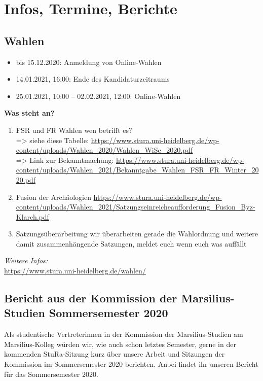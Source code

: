 \section{Infos, Termine, Berichte}

\subsection{Wahlen}
\begin{itemize}
    \item bis 15.12.2020: Anmeldung von Online-Wahlen
    \item 14.01.2021, 16:00: Ende des Kandidaturzeitraums
    \item 25.01.2021, 10:00 – 02.02.2021, 12:00: Online-Wahlen
\end{itemize}
\textbf{Was steht an?}
\begin{enumerate}
    \item FSR und FR Wahlen wen betrifft es?\\
    => siehe diese Tabelle: \url{https://www.stura.uni-heidelberg.de/wp-content/uploads/Wahlen_2020/Wahlen_WiSe_2020.pdf}\\
    => Link zur Bekanntmachung: \url{https://www.stura.uni-heidelberg.de/wp-content/uploads/Wahlen_2021/Bekanntgabe_Wahlen_FSR_FR_Winter_2020.pdf}
    \item Fusion der Archäologien \url{https://www.stura.uni-heidelberg.de/wp-content/uploads/Wahlen_2021/Satzungseinreicheaufforderung_Fusion_Byz-Klarch.pdf}
    \item  Satzungsüberarbeitung wir überarbeiten gerade die Wahlordnung und weitere damit zusammenhängende Satzungen, meldet euch wenn euch was auffällt
\end{enumerate}
\emph{Weitere Infos:}\\
\url{https://www.stura.uni-heidelberg.de/wahlen/}

\subsection{Bericht aus der Kommission der Marsilius-Studien Sommersemester 2020}
Als studentische Vertreterinnen in der Kommission der Marsilius-Studien am Marsilius-Kolleg würden wir, wie auch schon letztes Semester, gerne in der kommenden StuRa-Sitzung kurz über unsere Arbeit und Sitzungen der Kommission im Sommersemester 2020 berichten. Anbei findet ihr unseren Bericht für das Sommersemester 2020.
